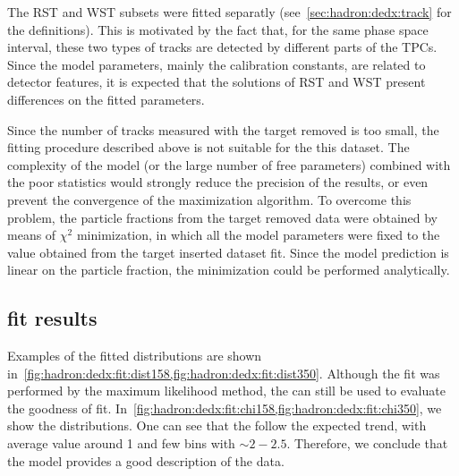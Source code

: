 The RST and WST subsets were fitted
separatly (see~\cref{sec:hadron:dedx:track} for the definitions).
This is motivated by the fact that, for the same phase space
interval, these two types of tracks are detected by
different parts of the TPCs. Since the model parameters,
mainly the calibration constants, are related to
detector features, it is expected that the solutions
of RST and WST present differences on the fitted
parameters.

Since the number of tracks measured with the target removed is
too small, the fitting procedure described above is not suitable for the
this dataset. The complexity of the model
(or the large number of free parameters) combined with
the poor statistics would strongly reduce the precision of
the results, or even prevent the convergence of the maximization
algorithm. To overcome this problem, the particle fractions
from the target removed data were obtained by means of
$\chi^2$ minimization, in which all the model parameters
were fixed to the value obtained from the target inserted
dataset fit. Since the model prediction is linear on
the particle fraction, the minimization could be performed
analytically. 

\subsection{\dedx fit results}
\label{sec:hadron:dedx:fitresults}


Examples of the fitted \dedx distributions are shown
in~\cref{fig:hadron:dedx:fit:dist158,fig:hadron:dedx:fit:dist350}.
Although the fit was performed by the maximum likelihood method,
the \redchisq can still be used to evaluate the goodness of fit.
In~\cref{fig:hadron:dedx:fit:chi158,fig:hadron:dedx:fit:chi350},
we show the \redchisq distributions.
One can see that the \redchisq follow the expected trend,
with average value around 1 and few bins with \redchisq$\sim2-2.5$.
Therefore, we conclude that the \dedx model
provides a good description of the data.

